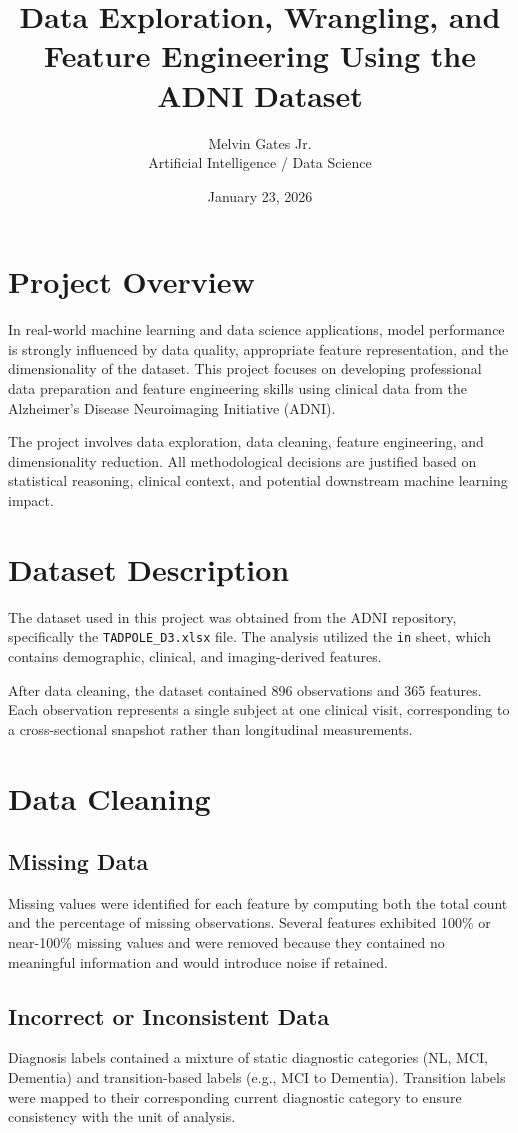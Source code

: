 \documentclass[11pt]{article}
\title{Data Exploration, Wrangling, and Feature Engineering Using the ADNI Dataset}
\author{Melvin Gates Jr. \\
Artificial Intelligence / Data Science}
\date{January 23, 2026}
\begin{document}
\maketitle

\section{Project Overview}
In real-world machine learning and data science applications, model performance is strongly influenced by data quality, appropriate feature representation, and the dimensionality of the dataset. This project focuses on developing professional data preparation and feature engineering skills using clinical data from the Alzheimer’s Disease Neuroimaging Initiative (ADNI).

The project involves data exploration, data cleaning, feature engineering, and dimensionality reduction. All methodological decisions are justified based on statistical reasoning, clinical context, and potential downstream machine learning impact.

\section{Dataset Description}
The dataset used in this project was obtained from the ADNI repository, specifically the \texttt{TADPOLE\_D3.xlsx} file. The analysis utilized the \texttt{in} sheet, which contains demographic, clinical, and imaging-derived features.

After data cleaning, the dataset contained 896 observations and 365 features. Each observation represents a single subject at one clinical visit, corresponding to a cross-sectional snapshot rather than longitudinal measurements.

\section{Data Cleaning}

\subsection{Missing Data}
Missing values were identified for each feature by computing both the total count and the percentage of missing observations. Several features exhibited 100\% or near-100\% missing values and were removed because they contained no meaningful information and would introduce noise if retained.

\subsection{Incorrect or Inconsistent Data}
Diagnosis labels contained a mixture of static diagnostic categories (NL, MCI, Dementia) and transition-based labels (e.g., MCI to Dementia). Transition labels were mapped to their corresponding current diagnostic category to ensure consistency with the unit of analysis.
\end{document}
